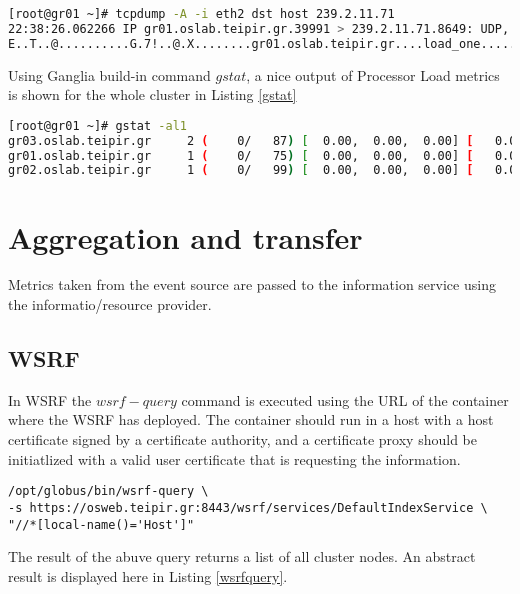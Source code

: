 \begin{lstlisting}[language=bash,caption=XDR sample]
[root@gr01 ~]# tcpdump -A -i eth2 dst host 239.2.11.71
22:38:26.062266 IP gr01.oslab.teipir.gr.39991 > 239.2.11.71.8649: UDP, length 56
E..T..@..........G.7!..@.X........gr01.oslab.teipir.gr....load_one........%.2f..
\end{lstlisting}

Using Ganglia build-in command $gstat$, a nice output of Processor Load metrics is shown for the whole cluster in Listing \ref{gstat}

\begin{lstlisting}[language=bash,caption=Gstat output,label=gstat]
[root@gr01 ~]# gstat -al1
gr03.oslab.teipir.gr     2 (    0/   87) [  0.00,  0.00,  0.00] [   0.0,   0.0,   0.0,  99.9,   0.1] OFF
gr01.oslab.teipir.gr     1 (    0/   75) [  0.00,  0.00,  0.00] [   0.0,   0.0,   0.0,  99.9,   0.0] OFF
gr02.oslab.teipir.gr     1 (    0/   99) [  0.00,  0.00,  0.00] [   0.0,   0.0,   0.1,  99.9,   0.0] OFF
\end{lstlisting}

\section{Aggregation and transfer}

Metrics taken from the event source are passed to the information service using the informatio/resource provider.

\subsection{WSRF}

In WSRF the $wsrf-query$ command is executed using the URL of the container where the WSRF has deployed. The container should run in a host with a host certificate signed by a certificate authority, and a certificate proxy should be initiatlized with a valid user certificate that is requesting the information. 

\begin{verbatim}
/opt/globus/bin/wsrf-query \
-s https://osweb.teipir.gr:8443/wsrf/services/DefaultIndexService \
"//*[local-name()='Host']"
\end{verbatim}

The result of the abuve query returns a list of all cluster nodes. An abstract result is displayed here in Listing \ref{wsrfquery}.

